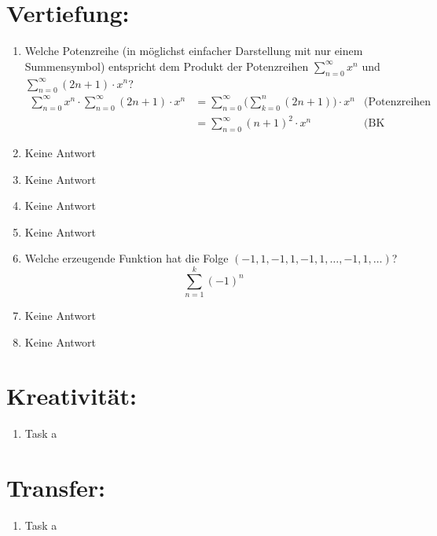 



    \maketitle
    \section*{Vertiefung:}
    \begin{enumerate}[label=(\alph*)]
        \item Welche Potenzreihe (in möglichst einfacher Darstellung mit nur einem Summensymbol) entspricht dem Produkt der Potenzreihen $\displaystyle\sum_{n=0}^{\infty} x^n$ und $\displaystyle\sum_{n=0}^{\infty} (2n+1)\cdot x^n$?\\
        \begin{align*}
            \sum_{n=0}^{\infty} x^n \cdot \sum_{n=0}^{\infty} (2n+1)\cdot x^n &= 
            \sum_{n=0}^{\infty} \Bigg(\sum_{k=0}^{n} (2n+1)\Bigg) \cdot x^n &\textrm{(Potenzreihen Rechnenregeln)}\\
            &= \sum_{n=0}^{\infty} (n+1)^2 \cdot x^n &\textrm{(BK Proposition 3.B)}
        \end{align*}

        \item Keine Antwort

        \item Keine Antwort

        \item Keine Antwort

        \item Keine Antwort

        \item Welche erzeugende Funktion hat die Folge $(-1, 1, -1, 1, -1, 1, \ldots , -1, 1, \ldots )$?\\
        \[\sum_{n=1}^{k} (-1)^n\]

        \item Keine Antwort

        \item Keine Antwort
    \end{enumerate}
    \section*{Kreativität:}
    \begin{enumerate}[label=(\alph*)]
        \item Task a
    \end{enumerate}
    \section*{Transfer:}
    \begin{enumerate}[label=(\alph*)]
        \item Task a
    \end{enumerate}







